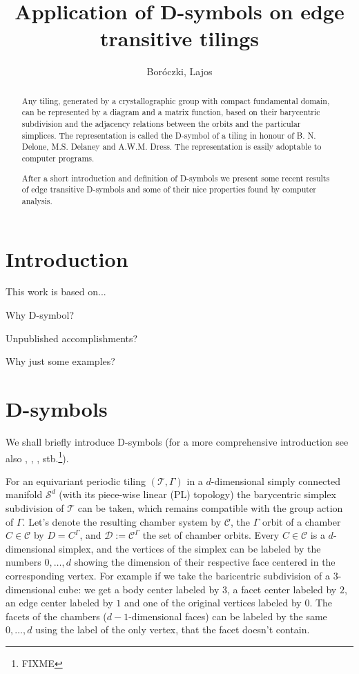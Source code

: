 \documentclass[12pt,a4paper]{article}
\theoremstyle{plain}%
\theoremstyle{definition}
\theoremstyle{remark}
\begin{document}
\title{Application of D-symbols on edge transitive tilings}
\author{Boróczki, Lajos}
\maketitle

\begin{abstract}
  Any tiling, generated by a crystallographic group with compact fundamental
  domain, can be represented by a diagram and a matrix function, based on
  their barycentric subdivision and the adjacency relations between the orbits
  and the particular simplices. The representation is called the D-symbol of a
  tiling in honour of B. N. Delone, M.S. Delaney and A.W.M. Dress. The
  representation is easily adoptable to computer programs.

  After a short introduction and definition of D-symbols we 
  present some recent results of edge transitive D-symbols and some of their
  nice properties found by computer analysis.
\end{abstract}

\section{Introduction}
This work is based on...

Why D-symbol?

Unpublished accomplishments?

Why just some examples?

\section{D-symbols}
We shall briefly introduce D-symbols (for a more comprehensive introduction see
also \cite{BSzK02}, \cite{DHM93}, \cite{M96}, stb.\footnote{FIXME}). 

For an equivariant periodic tiling $(\mathcal{T},\Gamma)$ in a $d$-dimensional
simply connected manifold $\mathcal{S}^d$ (with its piece-wise linear (PL)
topology) the barycentric simplex subdivision of $\mathcal{T}$ can be taken,
which remains compatible with the group action of $\Gamma$. Let's denote the
resulting chamber system by $\mathcal{C}$, the $\Gamma$ orbit of a chamber $C\in
\mathcal{C}$ by $D=C^\Gamma$, and $\mathcal{D}:= \mathcal{C}^\Gamma$ the set of
chamber orbits. Every $C\in \mathcal{C}$ is a $d$-dimensional simplex, and the
vertices of the simplex can be labeled by the numbers $0,\ldots,d$ showing the
dimension of their respective face centered in the corresponding vertex. For
example if we take the baricentric subdivision of a $3$-dimensional cube: we get
a body center labeled by $3$, a facet center labeled by $2$, an edge center
labeled by $1$ and one of the original vertices labeled by $0$. The facets of
the chambers ($d-1$-dimensional faces) can be labeled by the same $0,\ldots,d$
using the label of the only vertex, that the facet doesn't contain.
\end{document}
